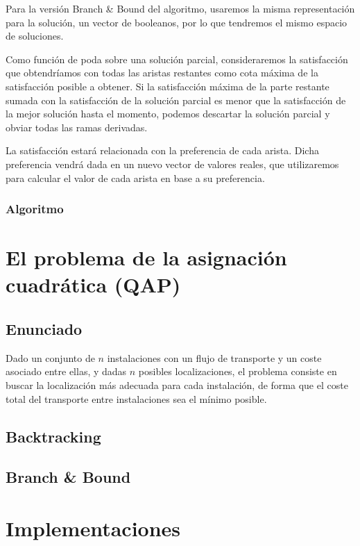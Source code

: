 \documentclass[a4paper, 11pt]{article} %
\begin{document}
    Para la versión Branch \& Bound del algoritmo, usaremos la misma representación para la solución, un vector de booleanos, por lo que tendremos el mismo espacio de soluciones.
    
    Como función de poda sobre una solución parcial, consideraremos la satisfacción que obtendríamos con todas las aristas restantes como cota máxima de la satisfacción posible a obtener. Si la satisfacción máxima de la parte restante sumada con la satisfacción de la solución parcial es menor que la satisfacción de la mejor solución hasta el momento, podemos descartar la solución parcial y obviar todas las ramas derivadas. 
    
    La satisfacción estará relacionada con la preferencia de cada arista. Dicha preferencia vendrá dada en un nuevo vector de valores reales, que utilizaremos para calcular el valor de cada arista en base a su preferencia. 
    
    \subsubsection{Algoritmo}    
    \small
	\texttt{}
    \normalsize

\section{El problema de la asignación cuadrática (QAP)}
  \subsection{Enunciado}
    Dado un conjunto de $n$ instalaciones con un flujo de transporte y un coste asociado entre ellas, y dadas $n$ posibles 
    localizaciones, el problema consiste en buscar la localización más adecuada para cada instalación, de forma que el 
    coste total del transporte entre instalaciones sea el mínimo posible. 

  \subsection{Backtracking}
  \subsection{Branch \& Bound}


\section{Implementaciones}
\end{document}
